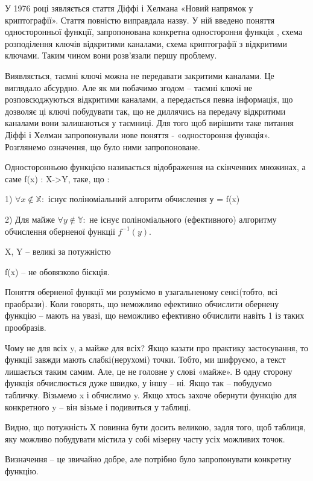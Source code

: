 У 1976 році зявляється стаття Діффі і Хелмана «Новий напрямок у криптографії». Стаття повністю виправдала назву. У ній введено поняття односторонньої функції, запропонована конкретна одностороння функція , схема розподілення ключів відкритими каналами, схема криптографії з відкритими ключами. Таким чином вони розв’язали першу проблему.

Виявляється, таємні ключі можна не передавати закритими каналами. Це виглядало абсурдно. Але як ми побачимо згодом – таємні ключі не розповсюджуються відкритими каналами, а передається певна інформація, що дозволяє ці ключі побудувати так, що не диллячись на передачу відкритими каналами вони залишаються у таємниці. Для того щоб вирішити таке питання Діффі і Хелман запропонували нове поняття - «одностороння функція». Розглянемо означення, що було ними запропоноване.

\begin{mydef}
Односторонньою функцією називається відображення на скінченних множинах, а саме f(x) : X->Y, таке, що :

1) $\forall x \notin \mathbb X\colon$
існує поліноміальний алгоритм обчислення у = f(x)

2) Для майже $\forall y\notin \mathbb Y \colon$
не існує поліноміального (ефективного) алгоритму обчислення оберненої 
функції $f^{-1}(y)$.

X, Y – великі за потужністю

f(x) – не обовязково бієкція.
\end{mydef}

Поняття оберненої функції ми розуміємо в узагальненому сенсі(тобто, всі праобрази). Коли говорять, що неможливо  ефективно обчислити обернену функцію – мають на увазі, що неможливо ефективно обчислити навіть 1 із таких прообразів.


Чому не для всіх y, а майже для всіх? Якщо казати про практику застосування, то функції завжди мають слабкі(нерухомі) точки. Тобто, ми шифруємо, а текст лишається таким самим. Але, це не головне у слові «майже». В одну сторону функція обчислюється дуже швидко, у іншу – ні. Якщо так – побудуємо  табличку. Візьмемо x і обчислимо y. Якщо хтось захоче обернути функцію для конкретного y – він візьме і подивиться у таблиці. 

Видно, що потужність Х повинна бути досить великою, задля того, щоб таблиця, яку можливо побудувати містила у собі мізерну часту усіх можливих точок.

Визначення – це звичайно добре, але потрібно було запропонувати конкретну функцію.

